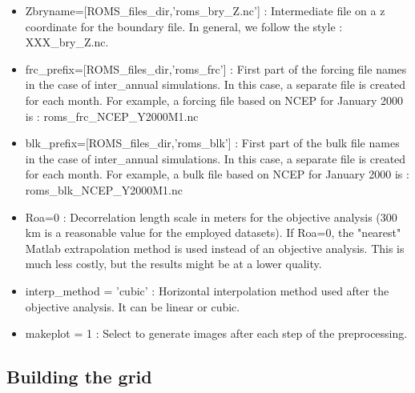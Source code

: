 \begin{itemize}
\item Zbryname=[ROMS\_files\_dir,'roms\_bry\_Z.nc'] : Intermediate file on a z coordinate
for the boundary file. In general, we follow the style : XXX\_bry\_Z.nc.
\item frc\_prefix=[ROMS\_files\_dir,'roms\_frc'] : First part of the forcing file names in
the case of inter\_annual simulations. In this case, a separate file is created for each month.
For example, a forcing file based on NCEP for January 2000 is : roms\_frc\_NCEP\_Y2000M1.nc
\item blk\_prefix=[ROMS\_files\_dir,'roms\_blk'] : First part of the bulk file names in
the case of inter\_annual simulations. In this case, a separate file is created for each month.
For example, a bulk file based on NCEP for January 2000 is : roms\_blk\_NCEP\_Y2000M1.nc
%
\item Roa=0 : Decorrelation length scale in meters for the objective analysis (300 km
is a reasonable value for the employed datasets). If Roa=0, the "nearest" Matlab extrapolation
method is used instead of an objective analysis. This is much less costly, but the 
results might be at a lower quality.
\item interp\_method = 'cubic' : Horizontal interpolation method used after the objective 
analysis. It can be linear or cubic.
\item makeplot     = 1 : Select to generate images after each step of the preprocessing.
\end{itemize}


\subsection{Building the grid}

